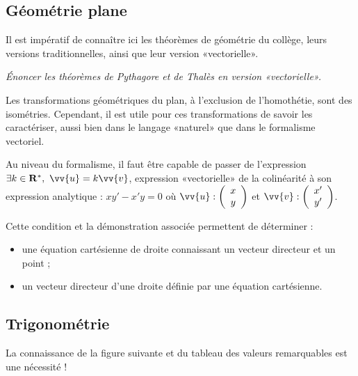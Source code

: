\documentclass[a4paper,12pt,french]{article}
\newcommand{\R}{\mathbf{R}}
\newcommand{\Vect}[2]{\left(\begin{array}{c}#1\\#2\end{array}\right)}
\begin{document}
\subsection{Géométrie plane}

Il est impératif de connaître ici les théorèmes de géométrie du collège,
leurs versions traditionnelles, ainsi que leur version «vectorielle».

\emph{Énoncer les théorèmes de Pythagore et de Thalès en version
«vectorielle».}

Les transformations géométriques du plan, à l'exclusion de l'homothétie,
sont des isométries. Cependant, il est utile pour ces transformations de
savoir les caractériser, aussi bien dans le langage «naturel» que dans
le formalisme vectoriel.

Au niveau du formalisme, il faut être capable de passer de l'expression
$\exists k\in\R^*,\ \vv{u} = k\vv{v}$, expression «vectorielle» de la
colinéarité à son expression analytique : $xy' - x'y = 0$ où $\vv{u} :
\Vect{x}{y}$ et $\vv{v}: \Vect{x'}{y'}$.

Cette condition et la démonstration associée permettent de déterminer :
\begin{itemize}
  \item une équation cartésienne de droite connaissant un vecteur
    directeur et un point ;
  \item un vecteur directeur d'une droite définie par une équation
    cartésienne.
\end{itemize}

\subsection{Trigonométrie}

La connaissance de la figure suivante et du tableau des valeurs
remarquables est une nécessité !

\begin{center}
\end{center}
\end{document}
